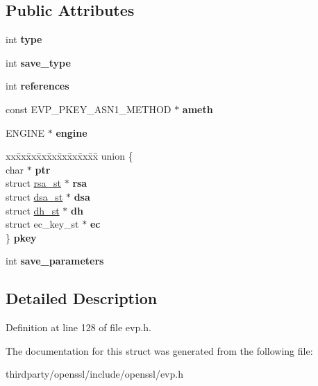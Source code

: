 \subsection*{Public Attributes}
\begin{DoxyCompactItemize}
\item 
\mbox{\label{structevp__pkey__st_a7d550d554ff45db26681e2d2e2f23b66}} 
int {\bfseries type}
\item 
\mbox{\label{structevp__pkey__st_a0bbebdbdbba1e1f9c796c1e4a3a2eb04}} 
int {\bfseries save\+\_\+type}
\item 
\mbox{\label{structevp__pkey__st_a89b11b788ffad7d747d1c7eed4cf279f}} 
int {\bfseries references}
\item 
\mbox{\label{structevp__pkey__st_a89d9cab6071d889719126a8ebc03b673}} 
const E\+V\+P\+\_\+\+P\+K\+E\+Y\+\_\+\+A\+S\+N1\+\_\+\+M\+E\+T\+H\+OD $\ast$ {\bfseries ameth}
\item 
\mbox{\label{structevp__pkey__st_a1fa3baf8af4a6f09233be9db77623e30}} 
E\+N\+G\+I\+NE $\ast$ {\bfseries engine}
\item 
\mbox{\label{structevp__pkey__st_aec604d9ccb5e7f147e5211e1568fa8d9}} 
\begin{tabbing}
xx\=xx\=xx\=xx\=xx\=xx\=xx\=xx\=xx\=\kill
union \{\\
\>char $\ast$ {\bfseries ptr}\\
\>struct \hyperlink{structrsa__st}{rsa\_st} $\ast$ {\bfseries rsa}\\
\>struct \hyperlink{structdsa__st}{dsa\_st} $\ast$ {\bfseries dsa}\\
\>struct \hyperlink{structdh__st}{dh\_st} $\ast$ {\bfseries dh}\\
\>struct ec\_key\_st $\ast$ {\bfseries ec}\\
\} {\bfseries pkey}\\

\end{tabbing}\item 
\mbox{\label{structevp__pkey__st_a5ce6533b78cc5e5814a60ca2403c3108}} 
int {\bfseries save\+\_\+parameters}
\end{DoxyCompactItemize}


\subsection{Detailed Description}


Definition at line 128 of file evp.\+h.



The documentation for this struct was generated from the following file\+:\begin{DoxyCompactItemize}
\item 
thirdparty/openssl/include/openssl/evp.\+h\end{DoxyCompactItemize}
